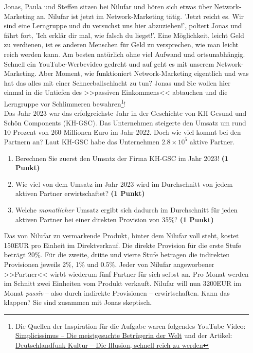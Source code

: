 \documentclass[a4paper, 9pt]{scrartcl}\usepackage[]{graphicx}\usepackage[]{xcolor}
\begin{document}
Jonas, Paula und Steffen sitzen bei Nilufar und hören sich etwas über Network-Marketing an. Nilufar ist jetzt im Network-Marketing tätig. 'Jetzt reicht es. Wir sind eine Lerngruppe und du versuchst uns hier abzuziehen!', poltert Jonas und fährt fort, 'Ich erklär dir mal, wie falsch du liegst!'. Eine Möglichkeit, leicht Geld zu verdienen, ist es anderen Menschen für Geld zu versprechen, wie man leicht reich werden kann. Am besten natürlich ohne viel Aufwand und ortsunabhängig. Schnell ein YouTube-Werbevideo gedreht und auf geht es mit unserem Network-Marketing. Aber Moment, wie funktioniert Network-Marketing eigentlich und was hat das alles mit einer Schneeballschlacht zu tun? Jonas und Sie wollen hier einmal in die Untiefen des >>passiven Einkommens<< abtauchen und die Lerngruppe vor Schlimmeren bewahren\footnote{Die Quellen der Inspiration für die Aufgabe waren folgendes YouTube Video: \href{https://youtu.be/UOKkZF_qK9M?si=uf4foJVFKfeQMwSw}{Simplicissimus -- Die meistgesuchte Betrügerin der Welt} und der Artikel: \href{https://www.deutschlandfunkkultur.de/netzwerk-marketing-die-illusion-schnell-reich-zu-werden-100.html}{Deutschlandfunk Kultur -- Die Illusion, schnell reich zu werden}}!\\

Das Jahr 2023 war das erfolgreichste Jahr in der Geschichte von KH Gesund und Schön Components (KH-GSC). Das Unternehmen steigerte den Umsatz um rund 10 Prozent von 260 Millionen Euro im Jahr 2022. Doch wie viel kommt bei den Partnern an? Laut KH-GSC habe das Unternehmen \ensuremath{2.8\times 10^{5}} aktive Partner.

\begin{enumerate}
\item Berechnen Sie zuerst den Umsatz der Firma KH-GSC im Jahr 2023! \textbf{(1 Punkt)}
\item Wie viel von dem Umsatz im Jahr 2023 wird im Durchschnitt von jedem aktiven Partner erwirtschaftet? \textbf{(1 Punkt)}
\item Welche \textit{monatlicher} Umsatz ergibt sich dadurch im Durchschnitt für jeden aktiven Partner bei einer direkten Provision von 35\%? \textbf{(1 Punkt)}
\end{enumerate}

Das von Nilufar zu vermarkende Produkt, hinter dem Nilufar voll steht, kostet 150EUR pro Einheit im Direktverkauf. Die direkte Provision für die erste Stufe beträgt 20\%. Für die zweite, dritte und vierte Stufe betragen die indirekten Provisionen jeweils 2\%, 1\% und 0.5\%. Jeder von Nilufar angeworbener >>Partner<< wirbt wiederum fünf Partner für sich selbst an. Pro Monat werden im Schnitt zwei Einheiten vom Produkt verkauft. Nilufar will nun 3200EUR im Monat \textit{passiv} -- also durch indirekte Provisionen -- erwirtschaften. Kann das klappen? Sie sind zusammen mit Jonas skeptisch.
\end{document}
